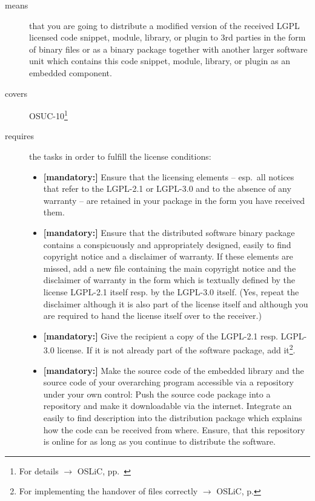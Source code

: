 \begin{description}
\item[means] that you are going to distribute a modified version of the received
LGPL licensed code snippet, module, library, or plugin to 3rd parties in the
form of binary files or as a binary package together with another larger
software unit which contains this code snippet, module, library, or plugin as an
embedded
component.
\item[covers] OSUC-10\footnote{For details $\rightarrow$ OSLiC, pp.\ \pageref{OSUC-10-DEF}}
\item[requires] the tasks in order to fulfill the license conditions:
\begin{itemize}

  \item \textbf{[mandatory:]} Ensure that the licensing elements -- esp.\ all
  notices that refer to the LGPL-2.1 or LGPL-3.0 and to the absence of any
  warranty -- are retained in your package in the form you have received them.

  \item \textbf{[mandatory:]} Ensure that the distributed software binary
  package contains a conspicuously and appropriately designed, easily to find
  copyright notice and a disclaimer of warranty. If these elements are missed,
  add a new file containing the main copyright notice and the disclaimer of
  warranty in the form which is textually defined by the license LGPL-2.1 itself
  resp. by the LGPL-3.0 itself. (Yes, repeat the disclaimer although it is also
  part of the license itself and although you are required to hand the license
  itself over to the receiver.)
  
  \item \textbf{[mandatory:]} Give the recipient a copy of the LGPL-2.1 resp.
  LGPL-3.0 license. If it is not already part of the software package, add
  it\footnote{For implementing the handover of files correctly $\rightarrow$
  OSLiC, p. \pageref{DistributingFilesHint}}.

  \item \textbf{[mandatory:]} Make the source code of the embedded library and
  the source code of your overarching program accessible via a repository under
  your own control: Push the source code package into a repository and make it
  downloadable via the internet. Integrate an easily to find description into
  the distribution package which explains how the code can be received from
  where. Ensure, that this repository is online for as long as you continue to
  distribute the software.


\end{itemize}
\end{description}
